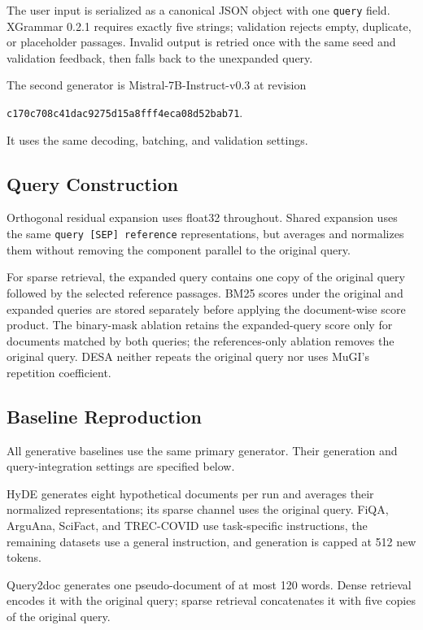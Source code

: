 The user input is serialized as a canonical JSON object with one \texttt{query} field. XGrammar 0.2.1 requires exactly five strings; validation rejects empty, duplicate, or placeholder passages. Invalid output is retried once with the same seed and validation feedback, then falls back to the unexpanded query.

The second generator is Mistral-7B-Instruct-v0.3 at revision

{\footnotesize\texttt{c170c708c41dac9275d15a8fff4eca08d52bab71}}.

It uses the same decoding, batching, and validation settings.

\subsection{Query Construction}

\label{query-construction}

Orthogonal residual expansion uses float32 throughout. Shared expansion uses the same \texttt{query\ {[}SEP{]}\ reference} representations, but averages and normalizes them without removing the component parallel to the original query.

For sparse retrieval, the expanded query contains one copy of the original query followed by the selected reference passages. BM25 scores under the original and expanded queries are stored separately before applying the document-wise score product. The binary-mask ablation retains the expanded-query score only for documents matched by both queries; the references-only ablation removes the original query. DESA neither repeats the original query nor uses MuGI's repetition coefficient.

\subsection{Baseline Reproduction}

\label{baseline-reproduction}

All generative baselines use the same primary generator. Their generation and query-integration settings are specified below.

HyDE generates eight hypothetical documents per run and averages their normalized representations; its sparse channel uses the original query. FiQA, ArguAna, SciFact, and TREC-COVID use task-specific instructions, the remaining datasets use a general instruction, and generation is capped at 512 new tokens.

Query2doc generates one pseudo-document of at most 120 words. Dense retrieval encodes it with the original query; sparse retrieval concatenates it with five copies of the original query.

